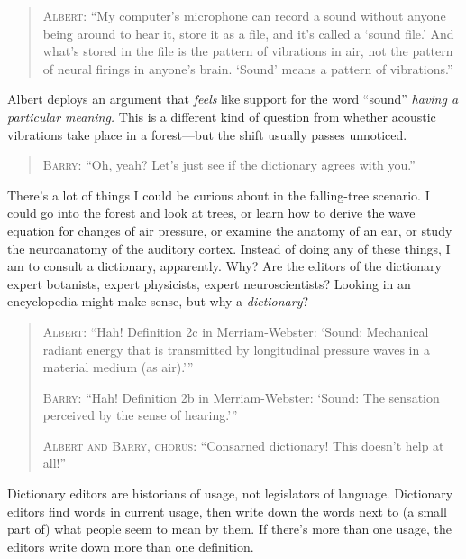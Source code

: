 {\begin{quotation}
{
 \textsc{Albert}: ``My computer's
microphone can record a sound without anyone being around to hear it,
store it as a file, and it's called a
`sound file.' And what's
stored in the file is the pattern of vibrations in air, not the pattern
of neural firings in anyone's brain.
`Sound' means a pattern of
vibrations.''}
\end{quotation}


 Albert deploys an argument that \textit{feels} like support for
the word ``sound'' \textit{having a
particular meaning.} This is a different kind of question from whether
acoustic vibrations take place in a forest---but the shift usually
passes unnoticed.

\begin{quotation}
{
 \textsc{Barry}: ``Oh, yeah? Let's just see
 if the dictionary agrees with you.''}
\end{quotation}


 There's a lot of things I could be curious about
in the falling-tree scenario. I could go into the forest and look at
trees, or learn how to derive the wave equation for changes of air
pressure, or examine the anatomy of an ear, or study the neuroanatomy
of the auditory cortex. Instead of doing any of these things, I am to
consult a dictionary, apparently. Why? Are the editors of the
dictionary expert botanists, expert physicists, expert neuroscientists?
Looking in an encyclopedia might make sense, but why a
\textit{dictionary}?

\begin{quotation}

 \textsc{Albert}: ``Hah! Definition 2c in Merriam-Webster:
`Sound: Mechanical radiant energy that is transmitted by
longitudinal pressure waves in a material medium (as
air).'''


 \textsc{Barry}: ``Hah! Definition 2b in Merriam-Webster:
`Sound: The sensation perceived by the sense of
hearing.'''

{
 \textsc{Albert and Barry, chorus}: ``Consarned dictionary!
 This doesn't help at all!''}
\end{quotation}


 Dictionary editors are historians of usage, not legislators of
language. Dictionary editors find words in current usage, then write
down the words next to (a small part of) what people seem to mean by
them. If there's more than one usage, the editors write
down more than one definition.

\begin{quotation}


\end{quotation}}
